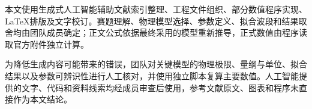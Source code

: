 本文使用生成式人工智能辅助文献索引整理、工程文件组织、部分数值程序实现、LaTeX排版及文字校订。赛题理解、物理模型选择、参数定义、拟合波段和结果取舍均由团队成员确定；正文公式依据最终采用的模型重新推导，正式数值由程序读取官方附件独立计算。

为降低生成内容可能带来的错误，团队对关键模型的物理极限、量纲与单位、拟合结果以及参数可辨识性进行人工核对，并使用独立脚本复算主要数值。人工智能提供的文字、代码和资料线索均经成员审查后使用，参考文献原文、图表和程序未直接作为本文结论。
